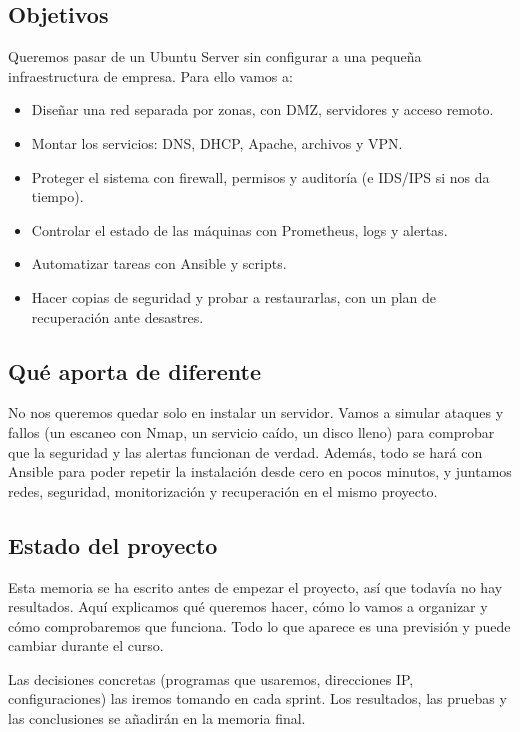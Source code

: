 \documentclass[12pt,a4paper]{article}
\begin{document}
\subsection{Objetivos}
Queremos pasar de un Ubuntu Server sin configurar a una pequeña infraestructura de empresa. Para ello vamos a:
\begin{itemize}
\item Diseñar una red separada por zonas, con DMZ, servidores y acceso remoto.
\item Montar los servicios: DNS, DHCP, Apache, archivos y VPN.
\item Proteger el sistema con firewall, permisos y auditoría (e IDS/IPS si nos da tiempo).
\item Controlar el estado de las máquinas con Prometheus, logs y alertas.
\item Automatizar tareas con Ansible y scripts.
\item Hacer copias de seguridad y probar a restaurarlas, con un plan de recuperación ante desastres.
\end{itemize}

\subsection{Qué aporta de diferente}
No nos queremos quedar solo en instalar un servidor. Vamos a simular ataques y fallos (un escaneo con Nmap, un servicio caído, un disco lleno) para comprobar que la seguridad y las alertas funcionan de verdad. Además, todo se hará con Ansible para poder repetir la instalación desde cero en pocos minutos, y juntamos redes, seguridad, monitorización y recuperación en el mismo proyecto.

\subsection{Estado del proyecto}
Esta memoria se ha escrito antes de empezar el proyecto, así que todavía no hay resultados. Aquí explicamos qué queremos hacer, cómo lo vamos a organizar y cómo comprobaremos que funciona. Todo lo que aparece es una previsión y puede cambiar durante el curso.

Las decisiones concretas (programas que usaremos, direcciones IP, configuraciones) las iremos tomando en cada sprint. Los resultados, las pruebas y las conclusiones se añadirán en la memoria final.
\end{document}
